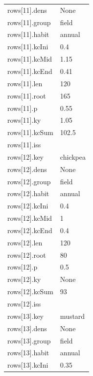 {\begin{longtable}{p{}p{}}
{}rows[11].dens & None\\
{}rows[11].group & field\\
{}rows[11].habit & annual\\
{}rows[11].kcIni & 0.4\\
{}rows[11].kcMid & 1.15\\
{}rows[11].kcEnd & 0.41\\
{}rows[11].len & 120\\
{}rows[11].root & 165\\
{}rows[11].p & 0.55\\
{}rows[11].ky & 1.05\\
{}rows[11].kcSum & 102.5\\
{}rows[11].iss & \\
{}rows[12].key & chickpea\\
{}rows[12].dens & None\\
{}rows[12].group & field\\
{}rows[12].habit & annual\\
{}rows[12].kcIni & 0.4\\
{}rows[12].kcMid & 1\\
{}rows[12].kcEnd & 0.4\\
{}rows[12].len & 120\\
{}rows[12].root & 80\\
{}rows[12].p & 0.5\\
{}rows[12].ky & None\\
{}rows[12].kcSum & 93\\
{}rows[12].iss & \\
{}rows[13].key & mustard\\
{}rows[13].dens & None\\
{}rows[13].group & field\\
{}rows[13].habit & annual\\
{}rows[13].kcIni & 0.35\\
\bottomrule\end{longtable}}

